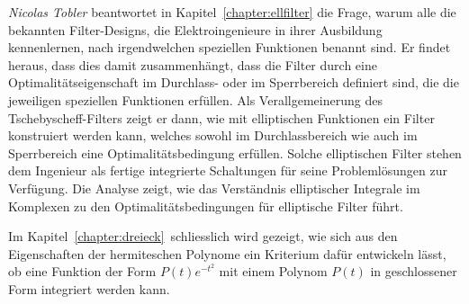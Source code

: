 {\em Nicolas Tobler}
%
%
beantwortet in Kapitel~\ref{chapter:ellfilter} die Frage,
warum alle die bekannten Filter-Designs, die Elektroingenieure in
ihrer Ausbildung kennenlernen, nach irgendwelchen speziellen Funktionen
benannt sind.
Er findet heraus, dass dies damit zusammenhängt, dass die Filter
durch eine Optimalitätseigenschaft im Durchlass- oder im Sperrbereich
definiert sind, die die jeweiligen speziellen Funktionen erfüllen.
Als Verallgemeinerung des Tschebyscheff-Filters zeigt er dann, wie
mit elliptischen Funktionen ein Filter konstruiert werden kann,
welches sowohl im Durchlassbereich wie auch im Sperrbereich eine 
Optimalitätsbedingung erfüllen.
Solche elliptischen Filter stehen dem Ingenieur als fertige integrierte
Schaltungen für seine Problemlösungen zur Verfügung.
Die Analyse zeigt, wie das Verständnis elliptischer Integrale 
im Komplexen zu den Optimalitätsbedingungen für elliptische
Filter führt.

Im Kapitel~\ref{chapter:dreieck} schliesslich wird gezeigt,
wie sich aus den Eigenschaften der hermiteschen Polynome
ein Kriterium dafür entwickeln lässt, ob eine Funktion der Form
$P(t)e^{-t^2}$ mit einem Polynom $P(t)$ in geschlossener Form
integriert werden kann.

